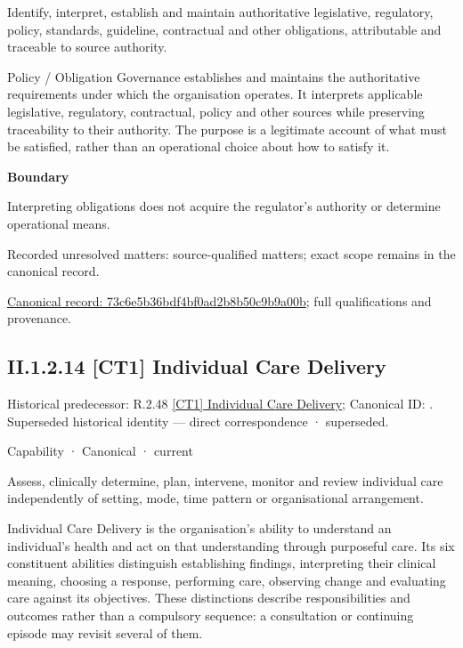 Identify, interpret, establish and maintain authoritative legislative, regulatory, policy, standards, guideline, contractual and other obligations, attributable and traceable to source authority.



Policy / Obligation Governance establishes and maintains the authoritative requirements under which the organisation operates. It interprets applicable legislative, regulatory, contractual, policy and other sources while preserving traceability to their authority. The purpose is a legitimate account of what must be satisfied, rather than an operational choice about how to satisfy it.



\textbf{Boundary}



Interpreting obligations does not acquire the regulator's authority or determine operational means.


{\small Recorded unresolved matters: source-qualified matters; exact scope remains in the canonical record.}\par
{\footnotesize \href{../../../../../../../continuum/strategy/capability/73c6e5b36bdf4bf0ad2b8b50c9b9a00b.md}{Canonical record: 73c6e5b36bdf4bf0ad2b8b50c9b9a00b}; full qualifications and provenance.}\par
\subsection*{II.1.2.14 [CT1] Individual Care Delivery}
\label{navigation:II.1.2.14}

{\small Historical predecessor: R.2.48 \hyperref[element:162deb7e292042f78f677a14476a3a1d]{[CT1] Individual Care Delivery}; Canonical ID: \texttt{}. Superseded historical identity — direct correspondence · superseded.}\par
\label{element:b964a11cde594318aa14ff935414158a}
{\small Capability · Canonical · current}\par

Assess, clinically determine, plan, intervene, monitor and review individual care independently of setting, mode, time pattern or organisational arrangement.



Individual Care Delivery is the organisation's ability to understand an individual's health and act on that understanding through purposeful care. Its six constituent abilities distinguish establishing findings, interpreting their clinical meaning, choosing a response, performing care, observing change and evaluating care against its objectives. These distinctions describe responsibilities and outcomes rather than a compulsory sequence: a consultation or continuing episode may revisit several of them.



